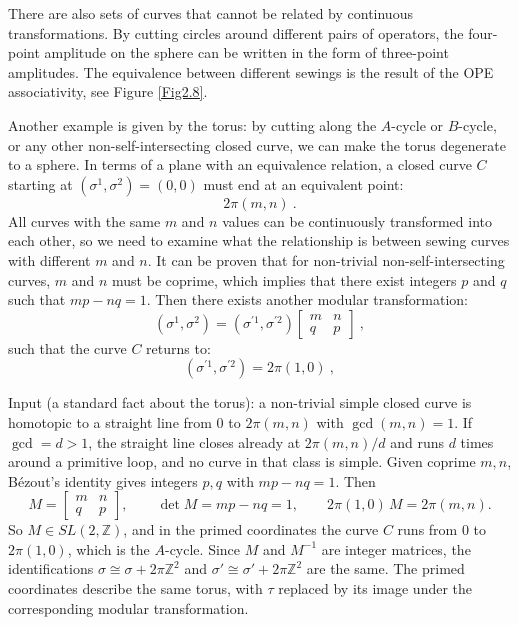 There are also sets of curves that cannot be related by continuous transformations. By cutting circles around different pairs of operators, the four-point amplitude on the sphere can be written in the form of three-point amplitudes. The equivalence between different sewings is the result of the OPE associativity, 
see Figure \ref{Fig2.8}.

Another example is given by the torus: by cutting along the $A$-cycle or $B$-cycle, or any other non-self-intersecting closed curve, we can make the torus degenerate to a sphere.
In terms of a plane with an equivalence relation, a closed curve $C$ starting at $(\sigma^{1}, \sigma^{2})=(0,0)$ must end at an equivalent point:
\begin{equation}
	2 \pi(m, n) \:. \label{9.4.10}
\end{equation}
All curves with the same $m$ and $n$ values can be continuously transformed into each other, so we need to examine what the relationship is between sewing curves with different $m$ and $n$.
It can be proven that for non-trivial non-self-intersecting curves, $m$ and $n$ must be coprime, which implies that there exist integers $p$ and $q$ such that $m p-n q=1$.
Then there exists another modular transformation:
\begin{equation}
	(\sigma^{1}, \sigma^{2}) = (\sigma^{\prime 1}, \sigma^{\prime 2}) \begin{bmatrix}
		m & n \\
		q & p		
	\end{bmatrix} \:, \label{9.4.11}
\end{equation}
such that the curve $C$ returns to:
\begin{equation}
	(\sigma^{\prime 1}, \sigma^{\prime 2})=2 \pi(1,0) \:, \label{9.4.12}
\end{equation}
\begin{tcolorbox}[breakable]
	\begin{remark}
		Input (a standard fact about the torus): a non-trivial simple closed curve is homotopic to a straight line from $0$ to $2\pi(m,n)$ with $\gcd(m,n)=1$. If $\gcd=d>1$, the straight line closes already at $2\pi(m,n)/d$ and runs $d$ times around a primitive loop, and no curve in that class is simple. Given coprime $m,n$, B\'ezout's identity gives integers $p,q$ with $mp-nq=1$. Then
		\begin{equation*}
			M=\begin{bmatrix}m&n\\q&p\end{bmatrix},\qquad\det M=mp-nq=1,\qquad
			2\pi(1,0)\,M=2\pi(m,n) .
		\end{equation*}
		So $M\in SL(2,\mathbb Z)$, and in the primed coordinates the curve $C$ runs from $0$ to $2\pi(1,0)$, which is the $A$-cycle. Since $M$ and $M^{-1}$ are integer matrices, the identifications $\sigma\cong\sigma+2\pi\mathbb Z^2$ and $\sigma'\cong\sigma'+2\pi\mathbb Z^2$ are the same. The primed coordinates describe the same torus, with $\tau$ replaced by its image under the corresponding modular transformation.
	\end{remark}
\end{tcolorbox}
